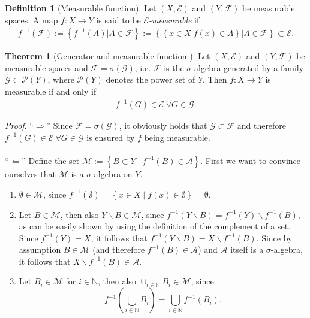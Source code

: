 \documentclass[12pt, a4paper]{article}
\numberwithin{equation}{section}
\theoremstyle{definition}
\theoremstyle{definition}
\newtheorem{defn}[thm]{Definition} %
\newtheorem{theorem}[thm]{Theorem}
\begin{document}
	\begin{defn}[Measurable function]
		Let $(X, \mathcal E)$ and $(Y, \mathcal F)$ be measurable spaces. A map $f: X\rightarrow Y$ is said to be \textit{$\mathcal E$-measurable} if 
		\begin{align} \label{measurable-mapping-eq}
			f^{-1}(\mathcal F) := \left\{ f^{-1}(A) \vert A\in \mathcal F \right\} := \left\{ \left\{ x\in X \vert f(x) \in A \right\} \vert A\in \mathcal F \right\} \subset \mathcal E.
		\end{align} 
	\end{defn}

	\begin{theorem}[Generator and measurable function \cite{measurable-functions}] \label{generator-and-measurable-function} Let $(X, \mathcal E)$ and $(Y, \mathcal F)$ be measurable spaces and $\mathcal F = \sigma(\mathcal G)$, i.e. $\mathcal F$ is the $\sigma$-algebra generated by a family $\mathcal G \subset \mathcal P(Y)$, where $\mathcal P(Y)$ denotes the power set of $Y$. Then $f: X\rightarrow Y$ is measurable if and only if 
		\begin{align}
			f^{-1}\left(G\right) \in \mathcal E \ \forall G\in\mathcal G. 
		\end{align}
	\end{theorem}
	\noindent \textit{Proof}. \enquote{$\Rightarrow$} Since $\mathcal F = \sigma(\mathcal G)$, it obviously holds that $\mathcal G\subset \mathcal F$ and therefore $f^{-1}(G)\in \mathcal E \ \forall G\in\mathcal G$ is ensured by $f$ being measurable. 
	\\ \\ 
	\enquote{$\Leftarrow$} Define the set $\mathcal M:= \left\{ B\subset Y \mid f^{-1}(B)\in \mathcal A \right\}$. First we want to convince ourselves that $\mathcal M$ is a $\sigma$-algebra on $Y$. 
	\begin{enumerate}
		\item $\emptyset \in \mathcal M$, since $f^{-1}(\emptyset) = \left\{ x\in X \mid f(x)\in \emptyset \right\} = \emptyset$. 
		
		\item Let $B\in \mathcal M$, then also $Y\backslash B\in \mathcal M$, since $f^{-1}\left(Y\backslash B\right) = f^{-1}(Y)\backslash f^{-1}(B)$, as can be easily shown by using the definition of the complement of a set. Since $f^{-1}(Y) = X$, it follows that $f^{-1}(Y\backslash B) = X\backslash f^{-1}(B)$. Since by assumption $B\in \mathcal M$ (and therefore $f^{-1}(B)\in \mathcal A$) and $\mathcal A$ itself is a $\sigma$-algebra, it follows that $X\backslash f^{-1}(B)\in\mathcal A$. 
		
		\item  Let $B_i \in \mathcal M$ for $i\in \mathbb N$, then also $\cup_{i\in\mathbb N}B_i\in \mathcal M$, since $$f^{-1}\left(\bigcup_{i\in\mathbb N}B_i\right) = \bigcup_{i\in\mathbb N}f^{-1}\left(B_i\right).$$ 
	\end{enumerate}
\end{document}
